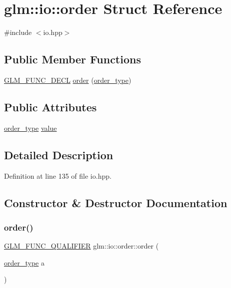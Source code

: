 \hypertarget{structglm_1_1io_1_1order}{}\section{glm\+::io\+::order Struct Reference}
\label{structglm_1_1io_1_1order}


{\ttfamily \#include $<$io.\+hpp$>$}

\subsection*{Public Member Functions}
\begin{DoxyCompactItemize}
\item 
\mbox{\hyperlink{setup_8hpp_ab2d052de21a70539923e9bcbf6e83a51}{G\+L\+M\+\_\+\+F\+U\+N\+C\+\_\+\+D\+E\+CL}} \mbox{\hyperlink{structglm_1_1io_1_1order_a06813d404c975865fdd3a77146268a1f}{order}} (\mbox{\hyperlink{namespaceglm_1_1io_a3497781803fe594a37177e05ab2a795f}{order\+\_\+type}})
\end{DoxyCompactItemize}
\subsection*{Public Attributes}
\begin{DoxyCompactItemize}
\item 
\mbox{\hyperlink{namespaceglm_1_1io_a3497781803fe594a37177e05ab2a795f}{order\+\_\+type}} \mbox{\hyperlink{structglm_1_1io_1_1order_aa8788dd0568bacd081d02bd5aca9889b}{value}}
\end{DoxyCompactItemize}


\subsection{Detailed Description}


Definition at line 135 of file io.\+hpp.



\subsection{Constructor \& Destructor Documentation}
\mbox{\label{structglm_1_1io_1_1order_a06813d404c975865fdd3a77146268a1f}} 
\subsubsection{\texorpdfstring{order()}{order()}}
{\footnotesize\ttfamily \mbox{\hyperlink{setup_8hpp_a33fdea6f91c5f834105f7415e2a64407}{G\+L\+M\+\_\+\+F\+U\+N\+C\+\_\+\+Q\+U\+A\+L\+I\+F\+I\+ER}} glm\+::io\+::order\+::order (\begin{DoxyParamCaption}\item[{\mbox{\hyperlink{namespaceglm_1_1io_a3497781803fe594a37177e05ab2a795f}{order\+\_\+type}}}]{a }\end{DoxyParamCaption})\hspace{0.3cm}{\ttfamily [explicit]}}



